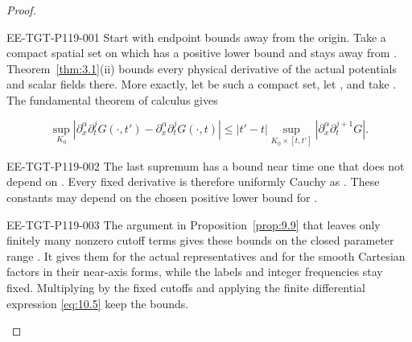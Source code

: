 \begin{proof}
\begin{EESegment}{EE-TGT-P119-001}
Start with endpoint bounds away from the origin. Take a compact spatial set on which
 has a positive lower bound and stays away from
. Theorem~\ref{thm:3.1}\textup{(ii)} bounds every physical derivative
of the actual potentials and scalar fields there. More exactly, let
 be such a compact set, let
, and take
. The fundamental theorem of calculus gives
\end{EESegment}
\[
\sup_{K_0}|\partial_x^\alpha\partial_t^jG(\mathord\cdot,t')
 -\partial_x^\alpha\partial_t^jG(\mathord\cdot,t)|
\leq|t'-t|\sup_{K_0\times[t,t']}|\partial_x^\alpha\partial_t^{j+1}G|.
\]
\begin{EESegment}{EE-TGT-P119-002}
The last supremum has a bound near time one that does not depend on
. Every fixed derivative is therefore uniformly Cauchy as
. These constants may depend on the chosen positive lower bound
for .
\end{EESegment}

\begin{EESegment}{EE-TGT-P119-003}
The argument in Proposition~\ref{prop:9.9} that leaves only finitely many nonzero cutoff terms
gives these bounds on the closed parameter range
. It gives them for the actual representatives and for the
smooth Cartesian factors in their near-axis forms, while the labels and integer frequencies stay
fixed. Multiplying by the fixed cutoffs and applying the finite differential expression
\eqref{eq:10.5} keep the bounds.
\end{EESegment}


\end{proof}

